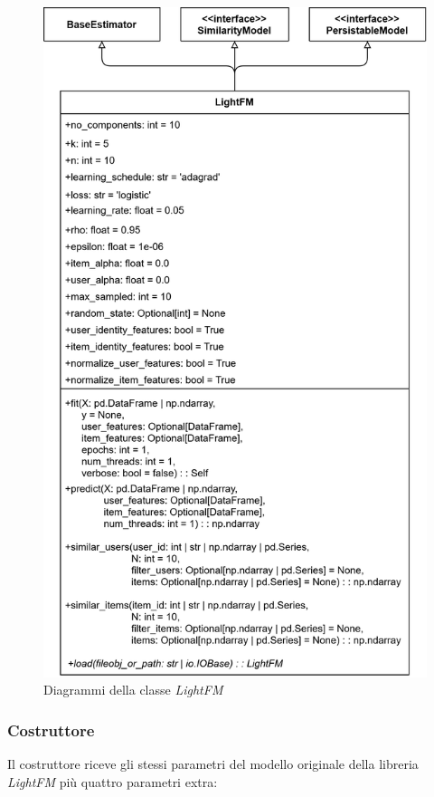 \begin{figure}[H]
    \centering
    \includegraphics[scale=0.2]{figures/UML/models/light_fm.png}
    \caption{Diagrammi della classe \textit{LightFM}}
\end{figure}

\subsubsection{Costruttore}

Il costruttore riceve gli stessi parametri del modello originale della libreria \textit{LightFM} più quattro parametri extra:

